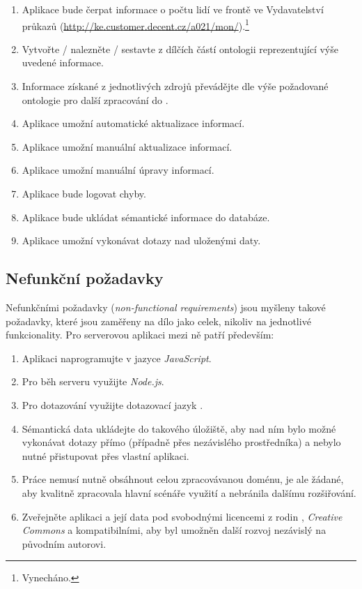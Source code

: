 \begin{enumerate}
 \item Aplikace bude čerpat informace o počtu lidí ve frontě ve Vydavatelství průkazů (\url{http://ke.customer.decent.cz/a021/mon/}).\footnote{Vynecháno.}
 \item Vytvořte / nalezněte / sestavte z dílčích částí ontologii reprezentující výše uvedené informace.
 \item Informace získané z jednotlivých zdrojů převádějte dle výše požadované ontologie pro další zpracování do .
 \item Aplikace umožní automatické aktualizace informací.
 \item Aplikace umožní manuální aktualizace informací.
 \item Aplikace umožní manuální úpravy informací.
 \item Aplikace bude logovat chyby.
 \item Aplikace bude ukládat sémantické informace do databáze.
 \item Aplikace umožní vykonávat dotazy nad uloženými daty.
\end{enumerate}

\subsection{Nefunkční požadavky}
Nefunkčními požadavky (\textit{non-functional requirements}) jsou myšleny takové požadavky, které jsou zaměřeny na dílo jako celek, nikoliv na jednotlivé funkcionality. Pro serverovou aplikaci mezi ně patří především:

\begin{enumerate}
 \item Aplikaci naprogramujte v jazyce \emph{JavaScript}.
 \item Pro běh serveru využijte \emph{Node.js}.
 \item Pro dotazování využijte dotazovací jazyk \emph{}.
 \item Sémantická data ukládejte do takového úložiště, aby nad ním bylo možné vykonávat dotazy přímo (případně přes nezávislého prostředníka) a nebylo nutné přistupovat přes vlastní aplikaci.
 \item Práce nemusí nutně obsáhnout celou zpracovávanou doménu, je ale žádané, aby kvalitně zpracovala hlavní scénáře využití a nebránila dalšímu rozšiřování.
 \item Zveřejněte aplikaci a její data pod svobodnými licencemi z rodin \emph{}, \emph{Creative Commons} a kompatibilními, aby byl umožněn další rozvoj nezávislý na původním autorovi.
\end{enumerate}



